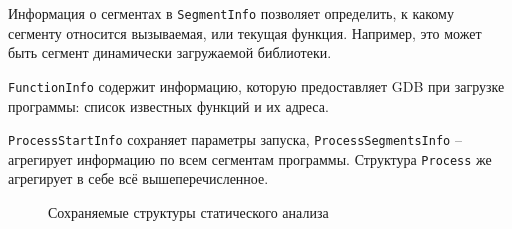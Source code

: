 Информация о сегментах в \texttt{SegmentInfo} позволяет определить, к какому сегменту относится
вызываемая, или текущая функция. Например, это может быть сегмент динамически загружаемой библиотеки.

\texttt{FunctionInfo} содержит информацию, которую предоставляет GDB при загрузке программы:
список известных функций и их адреса. 

\texttt{ProcessStartInfo} сохраняет параметры запуска, \texttt{ProcessSegmentsInfo} -- 
агрегирует информацию по всем сегментам программы.
Структура \texttt{Process} же агрегирует в себе всё вышеперечисленное.

\begin{figure}[!htbp]
    \centerfloat{
        
    }
    \caption{Сохраняемые структуры статического анализа \label{fig:static-json}}
\end{figure}

